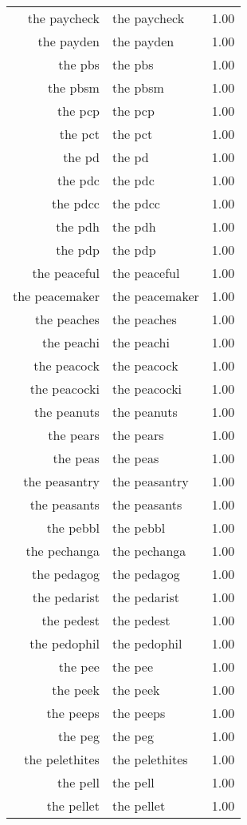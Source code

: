 \begin{table}[ht]
\begin{tabular}{rlr}
  the paycheck & the paycheck & 1.00 \\ 
  the payden & the payden & 1.00 \\ 
  the pbs & the pbs & 1.00 \\ 
  the pbsm & the pbsm & 1.00 \\ 
  the pcp & the pcp & 1.00 \\ 
  the pct & the pct & 1.00 \\ 
  the pd & the pd & 1.00 \\ 
  the pdc & the pdc & 1.00 \\ 
  the pdcc & the pdcc & 1.00 \\ 
  the pdh & the pdh & 1.00 \\ 
  the pdp & the pdp & 1.00 \\ 
  the peaceful & the peaceful & 1.00 \\ 
  the peacemaker & the peacemaker & 1.00 \\ 
  the peaches & the peaches & 1.00 \\ 
  the peachi & the peachi & 1.00 \\ 
  the peacock & the peacock & 1.00 \\ 
  the peacocki & the peacocki & 1.00 \\ 
  the peanuts & the peanuts & 1.00 \\ 
  the pears & the pears & 1.00 \\ 
  the peas & the peas & 1.00 \\ 
  the peasantry & the peasantry & 1.00 \\ 
  the peasants & the peasants & 1.00 \\ 
  the pebbl & the pebbl & 1.00 \\ 
  the pechanga & the pechanga & 1.00 \\ 
  the pedagog & the pedagog & 1.00 \\ 
  the pedarist & the pedarist & 1.00 \\ 
  the pedest & the pedest & 1.00 \\ 
  the pedophil & the pedophil & 1.00 \\ 
  the pee & the pee & 1.00 \\ 
  the peek & the peek & 1.00 \\ 
  the peeps & the peeps & 1.00 \\ 
  the peg & the peg & 1.00 \\ 
  the pelethites & the pelethites & 1.00 \\ 
  the pell & the pell & 1.00 \\ 
  the pellet & the pellet & 1.00 \\ 

\end{tabular}
\end{table}
